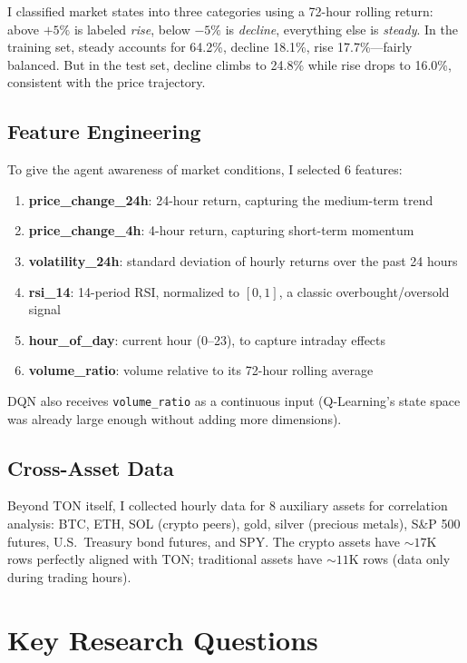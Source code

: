 \documentclass[11pt,a4paper]{article}
\begin{document}
I classified market states into three categories using a 72-hour rolling return: above $+5\%$ is labeled \emph{rise}, below $-5\%$ is \emph{decline}, everything else is \emph{steady}. In the training set, steady accounts for 64.2\%, decline 18.1\%, rise 17.7\%---fairly balanced. But in the test set, decline climbs to 24.8\% while rise drops to 16.0\%, consistent with the price trajectory.

\subsection{Feature Engineering}

To give the agent awareness of market conditions, I selected 6 features:

\begin{enumerate}[nosep]
    \item \textbf{price\_change\_24h}: 24-hour return, capturing the medium-term trend
    \item \textbf{price\_change\_4h}: 4-hour return, capturing short-term momentum
    \item \textbf{volatility\_24h}: standard deviation of hourly returns over the past 24 hours
    \item \textbf{rsi\_14}: 14-period RSI, normalized to $[0,1]$, a classic overbought/oversold signal
    \item \textbf{hour\_of\_day}: current hour (0--23), to capture intraday effects
    \item \textbf{volume\_ratio}: volume relative to its 72-hour rolling average
\end{enumerate}

DQN also receives \texttt{volume\_ratio} as a continuous input (Q-Learning's state space was already large enough without adding more dimensions).

\subsection{Cross-Asset Data}

Beyond TON itself, I collected hourly data for 8 auxiliary assets for correlation analysis: BTC, ETH, SOL (crypto peers), gold, silver (precious metals), S\&P 500 futures, U.S.\ Treasury bond futures, and SPY. The crypto assets have ${\sim}17$K rows perfectly aligned with TON; traditional assets have ${\sim}11$K rows (data only during trading hours).

\section{Key Research Questions}
\end{document}
